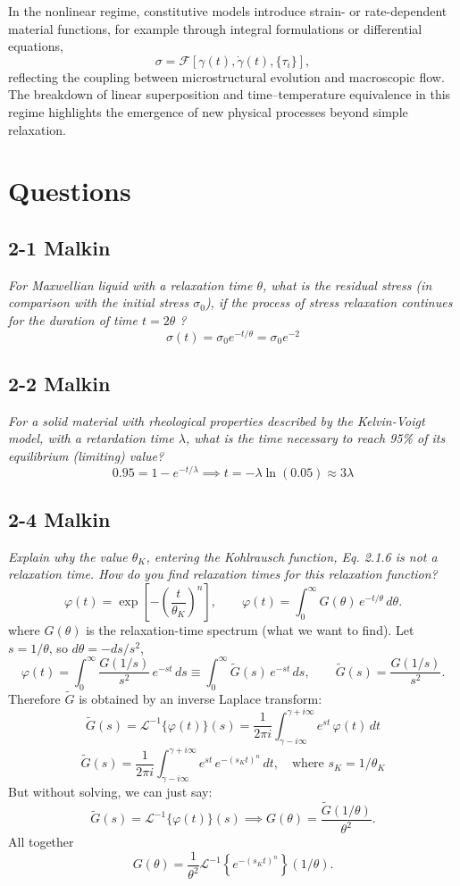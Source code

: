 In the nonlinear regime, constitutive models introduce strain- or rate-dependent material functions, for example through integral formulations or differential equations,
\begin{equation}
\sigma = \mathcal{F}\!\left[\gamma(t), \dot\gamma(t), \{\tau_i\}\right],
\end{equation}
reflecting the coupling between microstructural evolution and macroscopic flow. The breakdown of linear superposition and time--temperature equivalence in this regime highlights the emergence of new physical processes beyond simple relaxation.




\section{Questions}
\subsection{2-1 Malkin}
\textit{For Maxwellian liquid with a relaxation time $\theta$, what is the residual stress (in comparison with the initial stress $\sigma_0$), if the process of stress relaxation continues for the duration of  time $t = 2\theta$ ?}
\[
	\sigma(t) = \sigma_0 e^{-t/\theta} = \sigma_0 e^{-2}
\]

\subsection{2-2 Malkin}
\textit{For a solid material with rheological properties described by the Kelvin-Voigt model, with a retardation time $\lambda$, what is the time necessary to reach 95\% of its equilibrium (limiting) value?}
\[
	0.95 = 1 - e^{-t/\lambda} \implies t = -\lambda \ln(0.05) \approx 3 \lambda
\]

\subsection{2-4 Malkin}
\textit{Explain why the value $\theta_K$, entering the Kohlrausch function, Eq. 2.1.6 is not a relaxation  time. How do you find relaxation times for this relaxation function?}
\[
\varphi(t)=\exp\!\left[-\left(\frac{t}{\theta_K}\right)^n\right],
\qquad
\varphi(t)=\int_0^\infty G(\theta)\,e^{-t/\theta}\,d\theta.
\]
where $G(\theta)$ is the relaxation-time spectrum (what we want to find).
Let $s=1/\theta$, so $d\theta=-ds/s^2$,
\[
\varphi(t)=\int_0^\infty \frac{G(1/s)}{s^2}\,e^{-st}\,ds
\equiv \int_0^\infty \tilde G(s)\,e^{-st}\,ds,
\qquad
\tilde G(s)=\frac{G(1/s)}{s^2}.
\]
Therefore $\tilde G$ is obtained by an inverse Laplace transform:
\[
\tilde G(s)=\mathcal L^{-1}\{\varphi(t)\}(s)
=\frac{1}{2\pi i}\int_{\gamma-i\infty}^{\gamma+i\infty}
e^{st}\,\varphi(t)\,dt
\]
\[
\boxed{\tilde G(s)=
\frac{1}{2\pi i}\int_{\gamma-i\infty}^{\gamma+i\infty}
e^{st}\,e^{-(s_K t)^n}\,dt, \quad \text{where } s_K=1/\theta_K}
\]
But without solving, we can just say:
\[
\tilde G(s)=\mathcal L^{-1}\{\varphi(t)\}(s)
\implies
G(\theta)=\frac{\tilde G(1/\theta)}{\theta^2}.
\]
All together
\[
	G(\theta) = \frac{1}{\theta^2}\mathcal L^{-1}\left\{e^{-(s_K t)^n}\right\}(1/\theta).
\]


